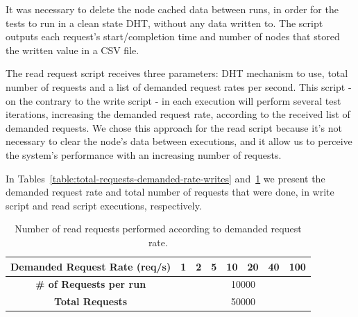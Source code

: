 It was necessary to delete the node cached data between runs, in order for the tests to run in a clean state DHT, without any data written to.
The script outputs each request's start/completion time and number of nodes that stored the written value in a CSV file.

The read request script receives three parameters: DHT mechanism to use, total number of requests and a list of demanded request rates per second.
This script - on the contrary to the write script - in each execution will perform several test iterations, increasing the demanded request rate, according to the received list of demanded requests.
We chose this approach for the read script because it's not necessary to clear the node's data between executions, and it allow us to perceive the system's performance with an increasing number of requests.

In Tables~\ref{table:total-requests-demanded-rate-writes} and~\ref{table:total-requests-demanded-rate-reads} we present the demanded request rate and total number of requests that were done, in write script and read script executions, respectively.

\begin{table}[htb]
\centering
{}
\caption{Number of write requests performed according to demanded request rate.}
\label{table:total-requests-demanded-rate-writes}
\end{table}

\begin{table}[htb]
\centering
\begin{tabular}{cccccccc}
  \textbf{Demanded Request Rate (req/s)} & 1 & 2 & 5 & 10 & 20 & 40 & 100 \\ \hline
  \textbf{\# of Requests per run} & \multicolumn{7}{c}{10000} \\ \hline
  \textbf{Total Requests} & \multicolumn{7}{c}{50000} \\ \hline
\end{tabular}
\caption{Number of read requests performed according to demanded request rate.}
\label{table:total-requests-demanded-rate-reads}
\end{table}

